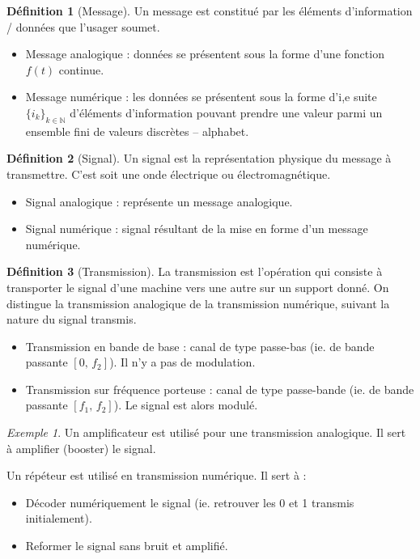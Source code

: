\documentclass[11pt,english,french]{scrreprt}
\theoremstyle{remark}
\newtheorem*{ex*}{Exemple}
\theoremstyle{definition}
\newtheorem*{def*}{Définition}
\begin{document}
\begin{def*}[Message]
	Un message est constitué par les éléments d'information / données que l'usager soumet. 
	
	\begin{itemize}
		\item Message analogique : données se présentent sous la forme d'une fonction $f(t)$ continue.
		\item Message numérique : les données se présentent sous la forme d'i,e suite $\{i_k\}_{k\in\mathbb{N}}$ d'éléments d'information pouvant prendre une valeur parmi un ensemble fini de valeurs discrètes -- alphabet.
	\end{itemize}
\end{def*}

\begin{def*}[Signal]
	Un signal est la représentation physique du message à transmettre. C'est soit une onde électrique ou électromagnétique.
	
	\begin{itemize}
		\item Signal analogique : représente un message analogique.
		\item Signal numérique : signal résultant de la mise en forme d'un message numérique.
	\end{itemize}
\end{def*}

\begin{def*}[Transmission]
	La transmission est l'opération qui consiste à transporter le signal d'une machine vers une autre sur un support donné. On distingue la transmission analogique de la transmission numérique, suivant la nature du signal transmis.
	
	\begin{itemize}
		\item Transmission en bande de base : canal de type passe-bas (ie. de bande passante $[0,\,f_2]$). Il n'y a pas de modulation.
		\item Transmission sur fréquence porteuse : canal de type passe-bande (ie. de bande passante $[f_1,\,f_2]$). Le signal est alors modulé.
	\end{itemize}
\end{def*}

\begin{ex*}
	Un amplificateur est utilisé pour une transmission analogique. Il sert à amplifier (booster) le signal.
	
	Un répéteur est utilisé en transmission numérique. Il sert à :\begin{itemize}
		\item Décoder numériquement le signal (ie. retrouver les 0 et 1 transmis initialement).
		\item Reformer le signal sans bruit et amplifié.
	\end{itemize} 
\end{ex*}
\end{document}
